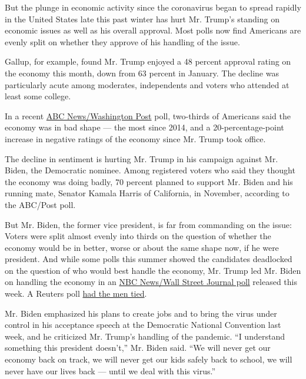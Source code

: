 But the plunge in economic activity since the coronavirus began to
spread rapidly in the United States late this past winter has hurt Mr.
Trump's standing on economic issues as well as his overall approval.
Most polls now find Americans are evenly split on whether they approve
of his handling of the issue.

Gallup, for example, found Mr. Trump enjoyed a 48 percent approval
rating on the economy this month, down from 63 percent in January. The
decline was particularly acute among moderates, independents and voters
who attended at least some college.

In a recent
\href{https://abcnews.go.com/PollingUnit/election-advantage-stays-biden-enthusiasm-deficit-eases-remains/story?id=72356854\&mc_cid=42713dcf7a\&mc_eid=\%5BUNIQID\%5D}{ABC
News/Washington Post} poll, two-thirds of Americans said the economy was
in bad shape --- the most since 2014, and a 20-percentage-point increase
in negative ratings of the economy since Mr. Trump took office.

The decline in sentiment is hurting Mr. Trump in his campaign against
Mr. Biden, the Democratic nominee. Among registered voters who said they
thought the economy was doing badly, 70 percent planned to support Mr.
Biden and his running mate, Senator Kamala Harris of California, in
November, according to the ABC/Post poll.

But Mr. Biden, the former vice president, is far from commanding on the
issue: Voters were split almost evenly into thirds on the question of
whether the economy would be in better, worse or about the same shape
now, if he were president. And while some polls this summer showed the
candidates deadlocked on the question of who would best handle the
economy, Mr. Trump led Mr. Biden on handling the economy in an
\href{https://www.nbcnews.com/politics/meet-the-press/biden-remains-ahead-trump-nationally-eve-conventions-nbc-news-wsj-n1236873}{NBC
News/Wall Street Journal poll} released this week. A Reuters poll
\href{https://www.ipsos.com/en-us/reutersipsos-core-political-survey-presidential-approval-tracker-08192020}{had
the men tied}.

Mr. Biden emphasized his plans to create jobs and to bring the virus
under control in his acceptance speech at the Democratic National
Convention last week, and he criticized Mr. Trump's handling of the
pandemic. ``I understand something this president doesn't,'' Mr. Biden
said. ``We will never get our economy back on track, we will never get
our kids safely back to school, we will never have our lives back ---
until we deal with this virus.''

